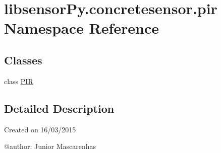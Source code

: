 \hypertarget{namespacelibsensorPy_1_1concretesensor_1_1pir}{}\section{libsensor\+Py.\+concretesensor.\+pir Namespace Reference}
\label{namespacelibsensorPy_1_1concretesensor_1_1pir}
\subsection*{Classes}
\begin{DoxyCompactItemize}
\item 
class \hyperlink{classlibsensorPy_1_1concretesensor_1_1pir_1_1PIR}{P\+I\+R}
\end{DoxyCompactItemize}


\subsection{Detailed Description}
\begin{DoxyVerb}Created on 16/03/2015

@author: Junior Mascarenhas
\end{DoxyVerb}
 